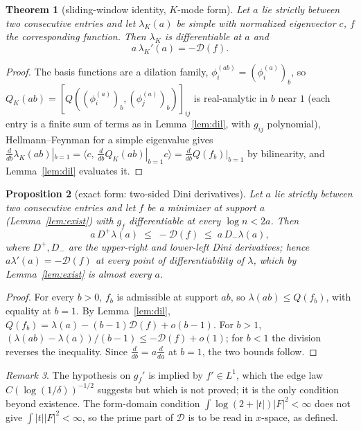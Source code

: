 \documentclass[11pt]{article}
\newtheorem{theorem}{Theorem}[section]
\newtheorem{proposition}[theorem]{Proposition}
\theoremstyle{definition}
\theoremstyle{remark}
\newtheorem{remark}[theorem]{Remark}
\newcommand{\ip}[2]{\langle #1,\, #2\rangle}
\newcommand{\Dp}{D^{+}}
\newcommand{\Dm}{D_{-}}
\begin{document}
\begin{theorem}[sliding-window identity, $K$-mode form]\label{thm:identity}
Let $a$ lie strictly between two consecutive entries and let $\lambda_K(a)$ be simple with normalized eigenvector $c$, $f$ the corresponding function. Then $\lambda_K$ is differentiable at $a$ and
\begin{equation}\label{eq:identity}
a\,\lambda_K'(a)=-\mathcal D(f).
\end{equation}
\end{theorem}
\begin{proof}
The basis functions are a dilation family, $\phi_i^{(ab)}=(\phi_i^{(a)})_b$, so $Q_K(ab)=[Q((\phi_i^{(a)})_b,(\phi_j^{(a)})_b)]_{ij}$ is real-analytic in $b$ near $1$ (each entry is a finite sum of terms as in Lemma~\ref{lem:dil}, with $g_{ij}$ polynomial), Hellmann--Feynman for a simple eigenvalue gives $\frac{d}{db}\lambda_K(ab)|_{b=1}=\ip{c}{\frac{d}{db}Q_K(ab)|_{b=1}c}=\frac{d}{db}Q(f_b)|_{b=1}$ by bilinearity, and Lemma~\ref{lem:dil} evaluates it.
\end{proof}

\begin{proposition}[exact form: two-sided Dini derivatives]\label{prop:dini}
Let $a$ lie strictly between two consecutive entries and let $f$ be a minimizer at support $a$ (Lemma~\ref{lem:exist}) with $g_f$ differentiable at every $\log n<2a$. Then
\[
a\,\Dp\lambda(a)\;\le\;-\mathcal D(f)\;\le\;a\,\Dm\lambda(a),
\]
where $\Dp,\Dm$ are the upper-right and lower-left Dini derivatives; hence $a\lambda'(a)=-\mathcal D(f)$ at every point of differentiability of $\lambda$, which by Lemma~\ref{lem:exist} is almost every $a$.
\end{proposition}
\begin{proof}
For every $b>0$, $f_b$ is admissible at support $ab$, so $\lambda(ab)\le Q(f_b)$, with equality at $b=1$. By Lemma~\ref{lem:dil}, $Q(f_b)=\lambda(a)-(b-1)\mathcal D(f)+o(b-1)$. For $b>1$, $(\lambda(ab)-\lambda(a))/(b-1)\le-\mathcal D(f)+o(1)$; for $b<1$ the division reverses the inequality. Since $\frac{d}{db}=a\frac{d}{da}$ at $b=1$, the two bounds follow.
\end{proof}

\begin{remark}
The hypothesis on $g_f'$ is implied by $f'\in L^1$, which the edge law $C(\log(1/\delta))^{-1/2}$ suggests but which is not proved; it is the only condition beyond existence. The form-domain condition $\int\log(2+|t|)|F|^2<\infty$ does not give $\int|t||F|^2<\infty$, so the prime part of $\mathcal D$ is to be read in $x$-space, as defined.
\end{remark}
\end{document}
